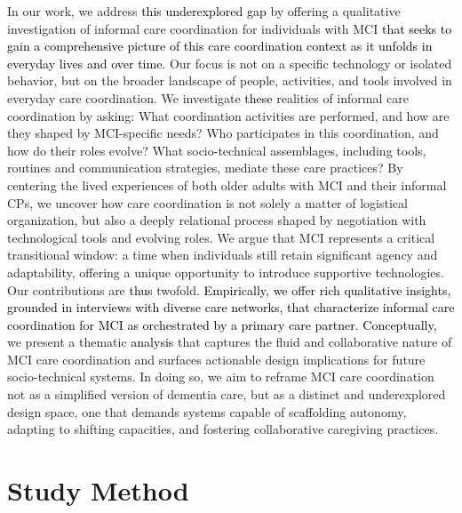 \documentclass[acmsmall]{acmart}
\begin{document}
In our work, we address \textcolor{black}{this underexplored gap} by offering a qualitative investigation of informal care coordination for individuals with MCI \textcolor{black}{that seeks to gain a comprehensive picture of this care coordination context as it unfolds in everyday lives and over time}. Our focus is not on a specific technology or isolated behavior, but on the broader landscape of people, activities, and tools involved in everyday care coordination. We investigate \textcolor{black}{these} realities of informal care coordination by asking: What coordination activities are performed, and how are they shaped by MCI-specific needs? Who participates in this coordination, and how do their roles evolve? What socio-technical assemblages, including tools, routines and communication strategies, mediate these care practices? By centering the lived experiences of both older adults with MCI and their informal CPs, we uncover how care coordination is not solely a matter of logistical organization, but also a deeply relational process shaped by negotiation with technological tools and evolving roles. We argue that MCI represents a critical transitional window: a time when individuals still retain significant agency and adaptability, offering a unique opportunity to introduce supportive technologies. Our contributions are \textcolor{black}{thus} twofold. \textcolor{black}{Empirically, we offer rich qualitative insights, grounded in interviews with diverse care networks, that characterize informal care coordination for MCI as orchestrated by a primary care partner. Conceptually,} we present a thematic \textcolor{black}{analysis} that captures the fluid and collaborative nature of MCI care coordination and surfaces actionable design implications for future socio-technical systems. In doing so, we aim to reframe MCI care coordination not as a simplified version of dementia care, but as a distinct and underexplored design space, one that demands systems capable of scaffolding autonomy, adapting to shifting capacities, and fostering collaborative caregiving practices.


\section{Study Method}
\end{document}
